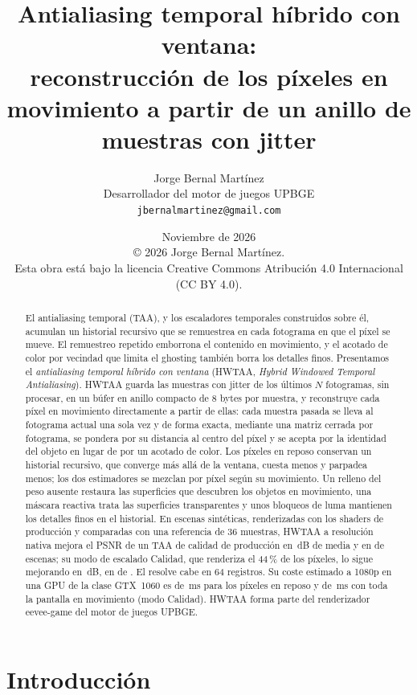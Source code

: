 \documentclass[11pt,a4paper]{article}
\title{Antialiasing temporal híbrido con ventana:\\reconstrucción de los píxeles en movimiento a partir de un anillo de muestras con jitter}
\author{Jorge Bernal Martínez\\
  \small Desarrollador del motor de juegos UPBGE\\
  \small\texttt{jbernalmartinez@gmail.com}}
\date{Noviembre de 2026\\[4pt]\footnotesize \copyright{} 2026 Jorge Bernal Martínez. \\ Esta obra está bajo la licencia Creative Commons Atribución 4.0 Internacional (CC BY 4.0).}
\begin{document}
\maketitle

\begin{abstract}
El antialiasing temporal (TAA), y los escaladores temporales construidos sobre él, acumulan un historial recursivo que se remuestrea en cada fotograma en que el píxel se mueve. El remuestreo repetido emborrona el contenido en movimiento, y el acotado de color por vecindad que limita el ghosting también borra los detalles finos. Presentamos el \emph{antialiasing temporal híbrido con ventana} (HWTAA, \emph{Hybrid Windowed Temporal Antialiasing}). HWTAA guarda las muestras con jitter de los últimos $N$ fotogramas, sin procesar, en un búfer en anillo compacto de 8 bytes por muestra, y reconstruye cada píxel en movimiento directamente a partir de ellas: cada muestra pasada se lleva al fotograma actual una sola vez y de forma exacta, mediante una matriz cerrada por fotograma, se pondera por su distancia al centro del píxel y se acepta por la identidad del objeto en lugar de por un acotado de color. Los píxeles en reposo conservan un historial recursivo, que converge más allá de la ventana, cuesta menos y parpadea menos; los dos estimadores se mezclan por píxel según su movimiento. Un relleno del peso ausente restaura las superficies que descubren los objetos en movimiento, una máscara reactiva trata las superficies transparentes y unos bloqueos de luma mantienen los detalles finos en el historial. En \nNumScenes{} escenas sintéticas, renderizadas con los shaders de producción y comparadas con una referencia de 36 muestras, HWTAA a resolución nativa mejora el PSNR de un TAA de calidad de producción en \nGainAllNat{}\,dB de media y en \nWinsNat{} de \nNumScenes{} escenas; su modo de escalado Calidad, que renderiza el 44\,\% de los píxeles, lo sigue mejorando en \nGainAllQ{}\,dB, en \nWinsQ{} de \nNumScenes{}. El resolve cabe en 64 registros. Su coste estimado a 1080p en una GPU de la clase GTX~1060 es de \nMsStillQHd{}\,ms para los píxeles en reposo y de \nMsMovingQHd{}\,ms con toda la pantalla en movimiento (modo Calidad). HWTAA forma parte del renderizador eevee-game del motor de juegos UPBGE.
\end{abstract}

\section{Introducción}
\end{document}

